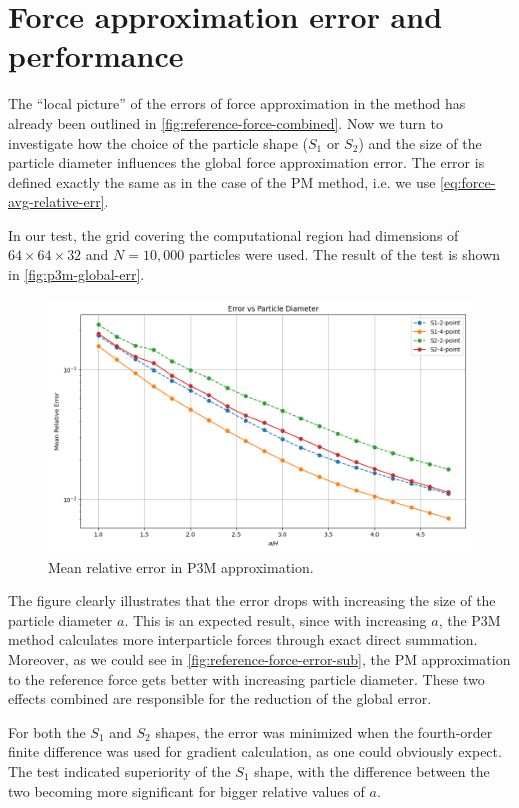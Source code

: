 \section{Force approximation error and performance}
The ``local picture'' of the errors of force approximation in the \PThreeM{} method has already been outlined in \autoref{fig:reference-force-combined}.
Now we turn to investigate how the choice of the particle shape ($S_1$ or $S_2$) and the size of the particle diameter influences the global force approximation error.
The error is defined exactly the same as in the case of the PM method, i.e. we use \autoref{eq:force-avg-relative-err}.

In our test, the grid covering the computational region had dimensions of $64\times 64\times 32$ and $N=10{,}000$ particles were used.
The result of the test is shown in \autoref{fig:p3m-global-err}.
\begin{figure}[htp]
    \centering
    \includegraphics[scale=0.5]{chapters/p3m-method/img/err_vs_part_diam_p3m.png}
    \caption{Mean relative error in P3M approximation.}
    \label{fig:p3m-global-err}
\end{figure}
The figure clearly illustrates that the error drops with increasing the size of the particle diameter $a$.
This is an expected result, since with increasing $a$, the P3M method calculates more interparticle forces through exact direct summation.
Moreover, as we could see in \autoref{fig:reference-force-error-sub}, the PM approximation to the reference force gets better with increasing particle diameter.
These two effects combined are responsible for the reduction of the global error.

For both the $S_1$ and $S_2$ shapes, the error was minimized when the fourth-order finite difference was used for gradient calculation, as one could obviously expect.
The test indicated superiority of the $S_1$ shape, with the difference between the two becoming more significant for bigger relative values of $a$.